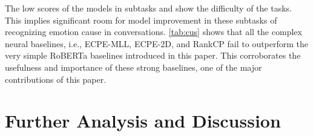 \documentclass[smallextended]{svjour3}
\newcommand\RECCON{recognizing emotion cause in conversations} \newcommand\ECRIC{ECRIC}
\newcommand\0{\hphantom{0}}
\begin{document}
The low scores of the models in 
subtasks  and  
show
the difficulty of the tasks. 
This implies
significant room for model improvement in these 
subtasks of \RECCON{}.
\cref{tab:cus} shows
that all the complex neural baselines, i.e., ECPE-MLL, ECPE-2D, and RankCP fail to outperform the very simple RoBERTa baselines introduced in this paper. This corroborates the usefulness and importance of these strong baselines, one of the major contributions of this paper.























    


  





































































\section{Further Analysis and Discussion} \label{sec:analysisx}
\end{document}

